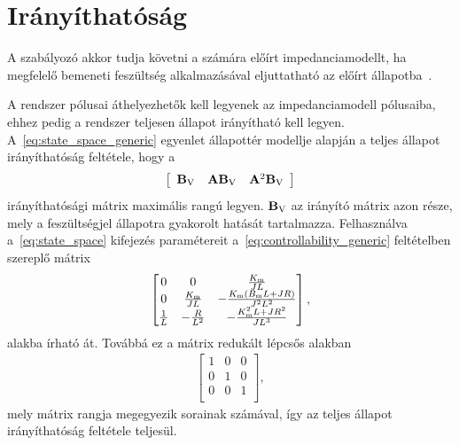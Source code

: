 \clearpage


\section{Irányíthatóság}\label{chap:controllability}
A szabályozó akkor tudja követni a számára előírt impedanciamodellt, 
ha megfelelő bemeneti feszültség alkalmazásával eljuttatható az előírt állapotba~\citep{kalman1963controllability}.

A rendszer pólusai áthelyezhetők kell legyenek az impedanciamodell pólusaiba, 
ehhez pedig a rendszer teljesen állapot irányítható kell legyen.
A~\eqref{eq:state_space_generic} egyenlet állapottér modellje alapján a teljes állapot irányíthatóság feltétele, hogy a
\begin{align}\label{eq:controllability_generic}
    \left[\begin{array}{c|c|c}
        \mathbf{B}_{\mathrm{V}} & \mathbf{A} \mathbf{B}_{\mathrm{V}} & \mathbf{A}^2 \mathbf{B}_{\mathrm{V}}
    \end{array}\right]
\end{align}
irányíthatósági mátrix maximális rangú legyen. \(\mathbf{B}_{\mathrm{V}}\) az irányító mátrix azon része, mely a 
feszültségjel állapotra gyakorolt hatását tartalmazza. 
Felhasználva a~\eqref{eq:state_space} kifejezés paramétereit a~\eqref{eq:controllability_generic} feltételben szereplő mátrix
\begin{align}
    \begin{bmatrix}
        0 & 0 & \frac{K_{\mathrm{m}}}{JL} \\
        0 & \frac{K_{\mathrm{m}}}{JL} & -\frac{K_{\mathrm{m}}\left(B_{\mathrm{m}} L + JR\right)}{J^2 L^2} \\
        \frac{1}{L} & -\frac{R}{L^2} & -\frac{K^2_{\mathrm{m}} L + JR^2}{J L^3} \\
    \end{bmatrix},
\end{align}
alakba írható át. Továbbá ez a mátrix redukált lépcsős alakban
\begin{align}
    \begin{bmatrix}
        1 & 0 & 0 \\
        0 & 1 & 0 \\
        0 & 0 & 1 \\
    \end{bmatrix},
\end{align}
mely mátrix rangja megegyezik sorainak számával, így az teljes állapot irányíthatóság feltétele teljesül.

